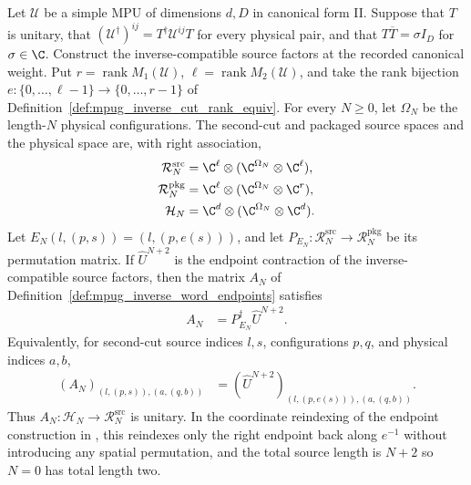 \begin{lemma}
    \label{thm:mpug_inverse_word_unitary}
    \leanok
    Let $\mathcal U$ be a simple MPU of dimensions $d,D$ in canonical
    form II. Suppose that $T$ is unitary, that
    $(\mathcal U^\dagger)^{ij}=T^\dagger\mathcal U^{ij}T$ for every
    physical pair, and that $T\overline T=\sigma I_D$ for $\sigma\in\C$.
    Construct the inverse-compatible source factors at the recorded
    canonical weight. Put $r=\operatorname{rank}M_1(\mathcal U)$,
    $\ell=\operatorname{rank}M_2(\mathcal U)$, and take the rank bijection
    $e\colon\{0,\ldots,\ell-1\}\to\{0,\ldots,r-1\}$ of
    Definition~\ref{def:mpug_inverse_cut_rank_equiv}.
    For every $N\geq0$, let $\Omega_N$ be the length-$N$ physical
    configurations. The second-cut and packaged source spaces and the physical
    space are, with right association,
    \begin{align}
        \mathcal R_N^{\mathrm{src}}
                     & =\C^\ell\otimes(\C^{\Omega_N}\otimes\C^\ell), \\
        \mathcal R_N^{\mathrm{pkg}}
                     & =\C^\ell\otimes(\C^{\Omega_N}\otimes\C^r),    \\
        \mathcal H_N & =\C^d\otimes(\C^{\Omega_N}\otimes\C^d).
    \end{align}
    Let $E_N(l,(p,s))=(l,(p,e(s)))$, and let
    $P_{E_N}\colon\mathcal R_N^{\mathrm{src}}\to\mathcal R_N^{\mathrm{pkg}}$
    be its permutation matrix. If $\widehat U^{N+2}$ is the endpoint
    contraction of the inverse-compatible source factors, then the
    matrix $A_N$ of Definition~\ref{def:mpug_inverse_word_endpoints} satisfies
    \begin{align}
        A_N & =P_{E_N}^\dagger\widehat U^{N+2}.
    \end{align}
    Equivalently, for second-cut source indices $l,s$, configurations $p,q$, and
    physical indices $a,b$,
    \begin{align}
        (A_N)_{(l,(p,s)),(a,(q,b))}
         & =(\widehat U^{N+2})_{(l,(p,e(s))),(a,(q,b))}.
    \end{align}
    Thus $A_N\colon\mathcal H_N\to\mathcal R_N^{\mathrm{src}}$ is
    unitary. In the coordinate reindexing of the endpoint construction in
    \cite[lines~2062--2099 and 5390--5487]{FrancoRubio2025MPUGauging},
    this reindexes only the right endpoint back along $e^{-1}$ without
    introducing any spatial permutation, and the total source length is
    $N+2$ so $N=0$ has total length two.
\end{lemma}
